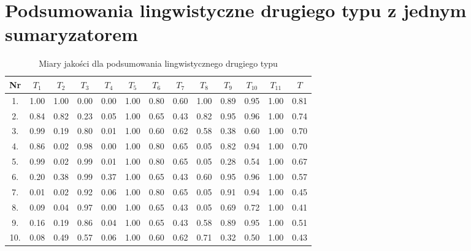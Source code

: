 \documentclass{article}
\begin{document}
    \section{Podsumowania lingwistyczne drugiego typu z jednym sumaryzatorem}
    
    \begin{table}[h!]
    \centering
    \begin{tabular}{|c|c|c|c|c|c|c|c|c|c|c|c|c|}
    \hline
    \textbf{Nr} & \textbf{\(T_1\)} &\textbf{\(T_2\)} & \textbf{\(T_3\)} & \textbf{\(T_4\)} & \textbf{\(T_5\)} & \textbf{\(T_6\)} & \textbf{\(T_7\)} & \textbf{\(T_8\)} & \textbf{\(T_9\)} & \textbf{\(T_{10}\)} & \textbf{\(T_{11}\)} & \textbf{\(T\)}\\
    \hline
    1. & 1.00 & 1.00 & 0.00 & 0.00 & 1.00 & 0.80 & 0.60 & 1.00 & 0.89 & 0.95 & 1.00 & 0.81 \\
    \hline
    2. & 0.84 & 0.82 & 0.23 & 0.05 & 1.00 & 0.65 & 0.43 & 0.82 & 0.95 & 0.96 & 1.00 & 0.74 \\
    \hline
    3. & 0.99 & 0.19 & 0.80 & 0.01 & 1.00 & 0.60 & 0.62 & 0.58 & 0.38 & 0.60 & 1.00 & 0.70 \\
    \hline
    4. & 0.86 & 0.02 & 0.98 & 0.00 & 1.00 & 0.80 & 0.65 & 0.05 & 0.82 & 0.94 & 1.00 & 0.70 \\
    \hline
    5. & 0.99 & 0.02 & 0.99 & 0.01 & 1.00 & 0.80 & 0.65 & 0.05 & 0.28 & 0.54 & 1.00 & 0.67 \\
    \hline 
    6. & 0.20 & 0.38 & 0.99 & 0.37 & 1.00 & 0.65 & 0.43 & 0.60 & 0.95 & 0.96 & 1.00 & 0.57 \\
    \hline 
    7. & 0.01 & 0.02 & 0.92 & 0.06 & 1.00 & 0.80 & 0.65 & 0.05 & 0.91 & 0.94 & 1.00 & 0.45 \\ 
    \hline
    8. & 0.09 & 0.04 & 0.97 & 0.00 & 1.00 & 0.65 & 0.43 & 0.05 & 0.69 & 0.72 & 1.00 & 0.41 \\
    \hline
    9. & 0.16 & 0.19 & 0.86 & 0.04 & 1.00 & 0.65 & 0.43 & 0.58 & 0.89 & 0.95 & 1.00 & 0.51 \\ 
    \hline
    10. & 0.08 & 0.49 & 0.57 & 0.06 & 1.00 & 0.60 & 0.62 & 0.71 & 0.32 & 0.50 & 1.00 & 0.43 \\ \hline
    \end{tabular}
    \caption{Miary jakości dla podsumowania lingwistycznego drugiego typu}
    \end{table}
\end{document}
